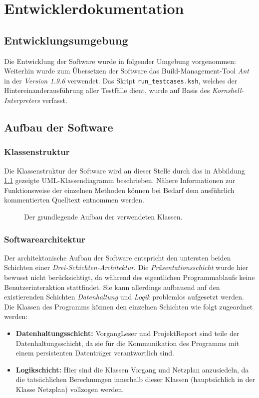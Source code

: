\chapter{Entwicklerdokumentation}
\label{Entwicklerdokumentation}

\section{Entwicklungsumgebung}
Die Entwicklung der Software wurde in folgender Umgebung vorgenommen:
\makeenvironment
Weiterhin wurde zum \"Ubersetzen der Software das
Build-Management-Tool \textit{Ant} in der \textit{Version 1.9.6}
verwendet. Das Skript \texttt{run\_testcases.ksh}, welches der
Hintereinanderausf\"uhrung aller Testf\"alle dient, wurde auf Basis
des \textit{Kornshell-Interpreters} verfasst.

\section{Aufbau der Software}

\subsection{Klassenstruktur}

Die Klassenstruktur der Software wird an dieser Stelle durch das in
Abbildung \ref{klassendiagramm} gezeigte UML-Klassendiagramm
beschrieben. N\"ahere Informationen zur Funktionsweise der einzelnen
Methoden k\"onnen bei Bedarf dem ausf\"uhrlich kommentierten Quelltext
entnommen werden.

\begin{figure}
  \resizebox{\textwidth}{!}{
    
  }
  \caption{Der grundlegende Aufbau der verwendeten Klassen.}
  \label{klassendiagramm}
\end{figure}

\subsection{Softwarearchitektur}

Der architektonische Aufbau der Software entspricht den
untersten beiden Schichten einer
\textit{Drei-Schichten-Architektur}. Die
\textit{Pr\"asentationsschicht} wurde
hier bewusst nicht ber\"ucksichtigt, da w\"ahrend des eigentlichen
Programmablaufs keine Benutzerinteraktion stattfindet. Sie kann
allerdings aufbauend auf den existierenden Schichten
\textit{Datenhaltung} und \textit{Logik} problemlos aufgesetzt werden.
Die Klassen des Programms k\"onnen den einzelnen Schichten wie folgt
zugeordnet werden:
\begin{itemize}
  \item \textbf{Datenhaltungsschicht:} VorgangLeser und ProjektReport
    sind teile der Datenhaltungsschicht, da sie f\"ur die
    Kommunikation des Programms mit einem persistenten Datentr\"ager
    verantwortlich sind.
  \item \textbf{Logikschicht:} Hier sind die Klassen Vorgang und
    Netzplan anzusiedeln, da die tats\"achlichen Berechnungen
    innerhalb dieser Klassen (haupts\"achlich in der Klasse Netzplan)
    vollzogen werden.
\end{itemize}

